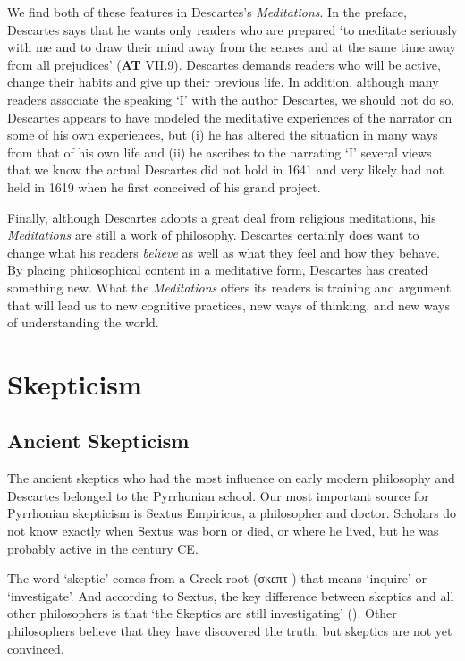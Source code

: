 We find both of these features in Descartes's \textit{Meditations}. In the preface, Descartes says that he wants only readers who are prepared `to meditate seriously with me and to draw their mind away from the senses and at the same time away from all prejudices' (\textbf{AT} VII.9). Descartes demands readers who will be active, change their habits and give up their previous life. In addition, although many readers associate the speaking `I' with the author Descartes, we should not do so. Descartes appears to have modeled the meditative experiences of the narrator on some of his own experiences, but (i) he has altered the situation in many ways from that of his own life and (ii) he ascribes to the narrating `I' several views that we know the actual Descartes did not hold in 1641 and very likely had not held in 1619 when he first conceived of his grand project.

Finally, although Descartes adopts a great deal from religious meditations, his \textit{Meditations} are still a work of philosophy. Descartes certainly does want to change what his readers \textit{believe} as well as what they feel and how they behave. By placing philosophical content in a meditative form, Descartes has created something new. What the \textit{Meditations} offers its readers is training and argument that will lead us to new cognitive practices, new ways of thinking, and new ways of understanding the world.

\section*{Skepticism}

\subsection*{Ancient Skepticism}

The ancient skeptics who had the most influence on early modern philosophy and Descartes belonged to the Pyrrhonian school. Our most important source for Pyrrhonian skepticism is Sextus Empiricus, a philosopher and doctor. Scholars do not know exactly when Sextus was born or died, or where he lived, but he was probably active in the  century CE.

The word `skeptic' comes from a Greek root (\textgreek{σκεπτ}-) that means `inquire' or `investigate'. And according to Sextus, the key difference between skeptics and all other philosophers is that `the Skeptics are still investigating' (\citet[I i 3]{annasbarnes1994}). Other philosophers believe that they have discovered the truth, but skeptics are not yet convinced.

